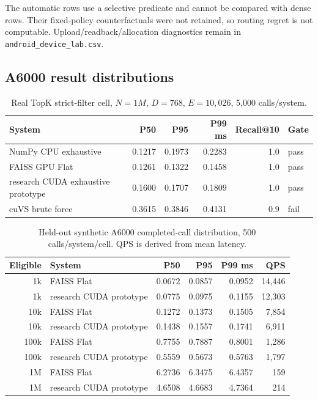 The automatic rows use a selective predicate and cannot be compared with dense rows. Their fixed-policy counterfactuals were not retained, so routing regret is not computable. Upload/readback/allocation diagnostics remain in \texttt{android\_device\_lab.csv}.

\subsection{A6000 result distributions}
\begin{table}[H]
\centering\scriptsize
\caption{Real TopK strict-filter cell, \(N=1M\), \(D=768\), \(E=10{,}026\), 5,000 calls/system.}
\begin{tabular}{lrrrrl}
\toprule
System & P50 & P95 & P99 ms & Recall@10 & Gate \\
\midrule
NumPy CPU exhaustive & 0.1217 & 0.1973 & 0.2283 & 1.0 & pass \\
FAISS GPU Flat & 0.1261 & 0.1322 & 0.1458 & 1.0 & pass \\
research CUDA exhaustive prototype & 0.1600 & 0.1707 & 0.1809 & 1.0 & pass \\
cuVS brute force & 0.3615 & 0.3846 & 0.4131 & 0.9 & fail \\
\bottomrule
\end{tabular}
\end{table}

\begin{table}[H]
\centering\scriptsize
\caption{Held-out synthetic A6000 completed-call distribution, 500 calls/system/cell. QPS is derived from mean latency.}
\begin{tabular}{rlrrrr}
\toprule
Eligible & System & P50 & P95 & P99 ms & QPS \\
\midrule
1k & FAISS Flat & 0.0672 & 0.0857 & 0.0952 & 14,446 \\
1k & research CUDA prototype & 0.0775 & 0.0975 & 0.1155 & 12,303 \\
10k & FAISS Flat & 0.1272 & 0.1373 & 0.1505 & 7,854 \\
10k & research CUDA prototype & 0.1438 & 0.1557 & 0.1741 & 6,911 \\
100k & FAISS Flat & 0.7755 & 0.7887 & 0.8001 & 1,286 \\
100k & research CUDA prototype & 0.5559 & 0.5673 & 0.5763 & 1,797 \\
1M & FAISS Flat & 6.2736 & 6.3475 & 6.4357 & 159 \\
1M & research CUDA prototype & 4.6508 & 4.6683 & 4.7364 & 214 \\
\bottomrule
\end{tabular}
\end{table}

